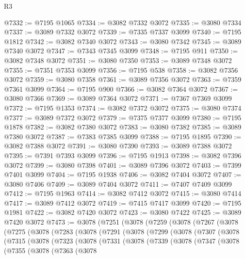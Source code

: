 \begin{lexlean}{R3}
\begin{coremodule}
@7332 := @7195 @1065
@7334 := @3082 @7332 @3072
@7335 := @3080 @7334
@7337 := @3089 @7332 @3072
@7339 := @7335 @7337 @3099
@7340 := @7195 @1812
@7342 := @3082 @7340 @3072
@7343 := @3080 @7342
@7345 := @3089 @7340 @3072
@7347 := @7343 @7345 @3099
@7348 := @7195 @911
@7350 := @3082 @7348 @3072
@7351 := @3080 @7350
@7353 := @3089 @7348 @3072
@7355 := @7351 @7353 @3099
@7356 := @7195 @538
@7358 := @3082 @7356 @3072
@7359 := @3080 @7358
@7361 := @3089 @7356 @3072
@7363 := @7359 @7361 @3099
@7364 := @7195 @900
@7366 := @3082 @7364 @3072
@7367 := @3080 @7366
@7369 := @3089 @7364 @3072
@7371 := @7367 @7369 @3099
@7372 := @7195 @1353
@7374 := @3082 @7372 @3072
@7375 := @3080 @7374
@7377 := @3089 @7372 @3072
@7379 := @7375 @7377 @3099
@7380 := @7195 @1878
@7382 := @3082 @7380 @3072
@7383 := @3080 @7382
@7385 := @3089 @7380 @3072
@7387 := @7383 @7385 @3099
@7388 := @7195 @1895
@7390 := @3082 @7388 @3072
@7391 := @3080 @7390
@7393 := @3089 @7388 @3072
@7395 := @7391 @7393 @3099
@7396 := @7195 @1913
@7398 := @3082 @7396 @3072
@7399 := @3080 @7398
@7401 := @3089 @7396 @3072
@7403 := @7399 @7401 @3099
@7404 := @7195 @1938
@7406 := @3082 @7404 @3072
@7407 := @3080 @7406
@7409 := @3089 @7404 @3072
@7411 := @7407 @7409 @3099
@7412 := @7195 @1963
@7414 := @3082 @7412 @3072
@7415 := @3080 @7414
@7417 := @3089 @7412 @3072
@7419 := @7415 @7417 @3099
@7420 := @7195 @1981
@7422 := @3082 @7420 @3072
@7423 := @3080 @7422
@7425 := @3089 @7420 @3072
@7473 := @3078
    (@7251
      (@3078
        (@7259
          (@3078
            (@7267
              (@3078
                (@7275
                  (@3078
                    (@7283
                      (@3078
                        (@7291
                          (@3078
                            (@7299
                              (@3078
                                (@7307
                                  (@3078
                                    (@7315
                                      (@3078
                                        (@7323
                                          (@3078
                                            (@7331
                                              (@3078
                                                (@7339
                                                  (@3078
                                                    (@7347
                                                      (@3078
                                                        (@7355
                                                          (@3078
                                                            (@7363
                                                              (@3078

\end{coremodule}
\end{lexlean}
